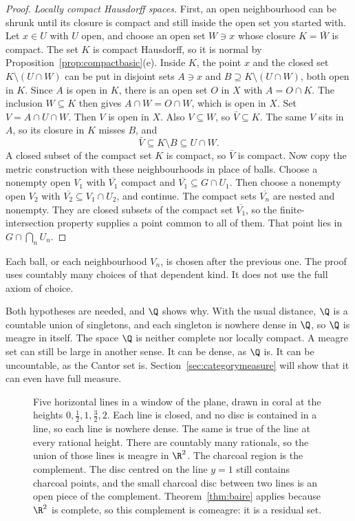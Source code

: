 \begin{proof}
\emph{Locally compact Hausdorff spaces.} First, an open neighbourhood can be shrunk until its closure is compact and still inside the open set you started with. Let $x\in U$ with $U$ open, and choose an open set $W\ni x$ whose closure $K=\bar W$ is compact. The set $K$ is compact Hausdorff, so it is normal by Proposition~\ref{prop:compactbasic}(e). Inside $K$, the point $x$ and the closed set $K\setminus(U\cap W)$ can be put in disjoint sets $A\ni x$ and $B\supseteq K\setminus(U\cap W)$, both open in $K$. Since $A$ is open in $K$, there is an open set $O$ in $X$ with $A=O\cap K$. The inclusion $W\subseteq K$ then gives $A\cap W=O\cap W$, which is open in $X$. Set $V=A\cap U\cap W$. Then $V$ is open in $X$. Also $V\subseteq W$, so $\bar V\subseteq K$. The same $V$ sits in $A$, so its closure in $K$ misses $B$, and
\[
\bar V\subseteq K\setminus B\subseteq U\cap W.
\]
A closed subset of the compact set $K$ is compact, so $\bar V$ is compact. Now copy the metric construction with these neighbourhoods in place of balls. Choose a nonempty open $V_1$ with $\overline{V_1}$ compact and $\overline{V_1}\subseteq G\cap U_1$. Then choose a nonempty open $V_2$ with $\overline{V_2}\subseteq V_1\cap U_2$, and continue. The compact sets $\overline{V_n}$ are nested and nonempty. They are closed subsets of the compact set $\overline{V_1}$, so the finite-intersection property supplies a point common to all of them. That point lies in $G\cap\bigcap_n U_n$.
\end{proof}

Each ball, or each neighbourhood $V_n$, is chosen after the previous one. The proof uses countably many choices of that dependent kind. It does not use the full axiom of choice.

Both hypotheses are needed, and $\Q$ shows why. With the usual distance, $\Q$ is a countable union of singletons, and each singleton is nowhere dense in $\Q$, so $\Q$ is meagre in itself. The space $\Q$ is neither complete nor locally compact. A meagre set can still be large in another sense. It can be dense, as $\Q$ is. It can be uncountable, as the Cantor set is. Section~\ref{sec:categorymeasure} will show that it can even have full measure.

\begin{figure}[ht]
\centering
{}
\caption{Five horizontal lines in a window of the plane, drawn in coral at the heights $0,\frac12,1,\frac32,2$. Each line is closed, and no disc is contained in a line, so each line is nowhere dense. The same is true of the line at every rational height. There are countably many rationals, so the union of those lines is meagre in $\R^2$. The charcoal region is the complement. The disc centred on the line $y=1$ still contains charcoal points, and the small charcoal disc between two lines is an open piece of the complement. Theorem~\ref{thm:baire} applies because $\R^2$ is complete, so this complement is comeagre: it is a residual set.}
\label{fig:rwlines}
\end{figure}

